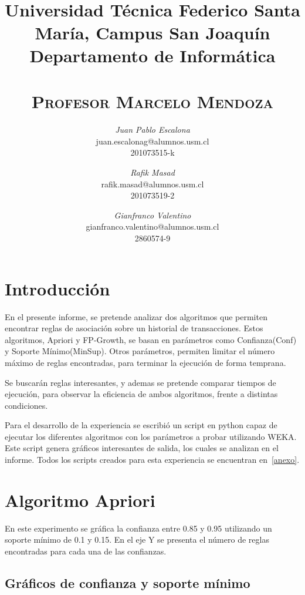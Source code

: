 \documentclass{article}
\title{
  \Large\textmd{\textbf{\tareaRamo\\ \tareaTitulo}}\\
  \vspace{0.1in}
  \normalsize
  Universidad Técnica Federico Santa María, Campus San Joaquín\\
  Departamento de Informática\\
  \vspace{0.1in}
  \small{\textsc{\tareaFecha}}\\
  \vspace{0.1in}
  \large{\textsc{Profesor Marcelo Mendoza}}
  \vspace{1.5in}
}
\author{
    \textit{Juan Pablo Escalona} \\
    \small{juan.escalonag@alumnos.usm.cl} \\
    \small{201073515-k}
    \and
    \textit{Rafik Masad} \\
    \small{rafik.masad@alumnos.usm.cl} \\
    \small{201073519-2}
    \and
    \textit{Gianfranco Valentino}\\
    \small{gianfranco.valentino@alumnos.usm.cl}\\
    \small{2860574-9}
}
\date{}
\begin{document}
\maketitle
\newpage


\section{Introducción}
En el presente informe, se pretende analizar dos algoritmos que permiten encontrar reglas de asociación sobre un historial de transacciones. Estos algoritmos, Apriori y FP-Growth, se basan en parámetros como Confianza(Conf) y Soporte Mínimo(MinSup). Otros parámetros, permiten limitar el número máximo de reglas encontradas, para terminar la ejecución de forma temprana.

Se buscarán reglas interesantes, y ademas se pretende comparar tiempos de ejecución, para observar la eficiencia de ambos algoritmos, frente a distintas condiciones.

Para el desarrollo de la experiencia se escribió un script en python capaz de ejecutar los diferentes algoritmos con los parámetros a probar utilizando WEKA. Este script genera gráficos interesantes de salida, los cuales se analizan en el informe. Todos los scripts creados para esta experiencia se encuentran en~\ref{anexo}.

\section{Algoritmo Apriori}

En este experimento se gráfica la confianza entre 0.85 y 0.95 utilizando un soporte mínimo de 0.1 y 0.15. En el eje Y se presenta el número de reglas encontradas para cada una de las confianzas.

\subsection{Gráficos de confianza y soporte mínimo}
\end{document}
